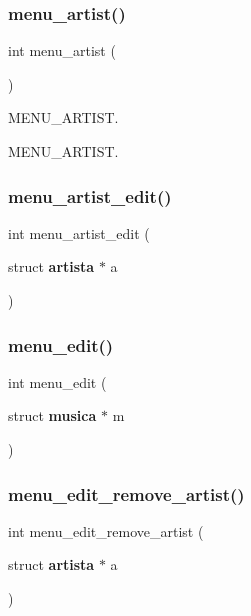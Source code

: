 \mbox{\label{project_8h_a7c5e73158caf3dee7454843b4bb18325}} 
\subsubsection{menu\_artist()}
{\footnotesize\ttfamily int menu\+\_\+artist (\begin{DoxyParamCaption}{ }\end{DoxyParamCaption})}



M\+E\+N\+U\+\_\+\+A\+R\+T\+I\+ST. 

M\+E\+N\+U\+\_\+\+A\+R\+T\+I\+ST. \mbox{\label{project_8h_a401bf9677fc64397b3fa33567e884aa7}} 
\subsubsection{menu\_artist\_edit()}
{\footnotesize\ttfamily int menu\+\_\+artist\+\_\+edit (\begin{DoxyParamCaption}\item[{struct \textbf{ artista} $\ast$}]{a }\end{DoxyParamCaption})}

\mbox{\label{project_8h_af746c1e5283b3e90dd4c74bc2626ed03}} 
\subsubsection{menu\_edit()}
{\footnotesize\ttfamily int menu\+\_\+edit (\begin{DoxyParamCaption}\item[{struct \textbf{ musica} $\ast$}]{m }\end{DoxyParamCaption})}

\mbox{\label{project_8h_ade4b36ae37d77141b3131c7758bed507}} 
\subsubsection{menu\_edit\_remove\_artist()}
{\footnotesize\ttfamily int menu\+\_\+edit\+\_\+remove\+\_\+artist (\begin{DoxyParamCaption}\item[{struct \textbf{ artista} $\ast$}]{a }\end{DoxyParamCaption})}

